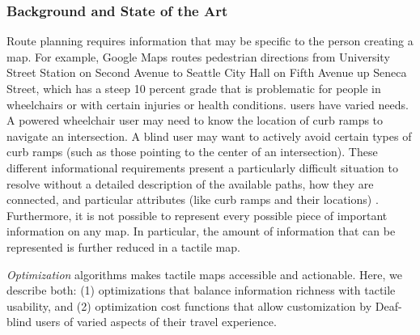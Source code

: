 
\subsubsection{Background and State of the Art}

Route planning requires information that may be specific to the person creating a map. For example, Google Maps routes pedestrian directions from University Street Station on Second Avenue to Seattle City Hall on Fifth Avenue up Seneca Street, which has a steep 10 percent grade that is problematic for people in wheelchairs or with certain injuries or health conditions.
users have varied needs.  A powered wheelchair user may need to know the location of curb ramps to navigate an intersection. A blind user may want to actively avoid certain types of curb ramps (such as those pointing to the center of an intersection). These different informational requirements present a particularly difficult situation to resolve without a detailed description of the available paths, how they are connected, and particular attributes (like curb ramps and their locations) \cite{bolten2017}. Furthermore, it is not possible to represent every possible piece of important information on any map. In particular, the amount of information that can be represented is further reduced in a tactile map. 

\textit{Optimization} algorithms makes tactile maps accessible and actionable.  Here, we describe both: (1) optimizations that balance information richness with tactile usability, and (2) optimization cost functions that allow customization by Deaf-blind users of varied aspects of their travel experience.

